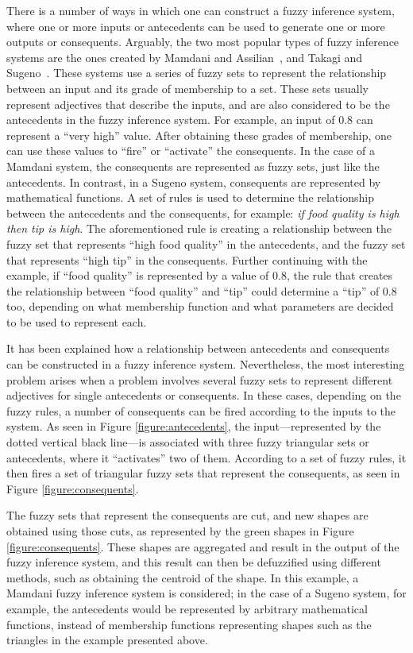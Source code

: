 \documentclass{ieeeaccess}
\begin{document}
There is a number of ways in which one can construct a fuzzy inference system,
where one or more inputs or antecedents can be used to generate one or more
outputs or consequents. Arguably, the two most popular types of fuzzy inference
systems are the ones created by Mamdani and Assilian~\cite{Mamdani1975}, and
Takagi and Sugeno~\cite{Takagi1985}. These systems use a series of fuzzy sets to
represent the relationship between an input and its grade of membership to a
set. These sets usually represent adjectives that describe the inputs, and are
also considered to be the antecedents in the fuzzy inference system. For
example, an input of 0.8 can represent a ``very high'' value. After obtaining
these grades of membership, one can use these values to ``fire'' or ``activate''
the consequents. In the case of a Mamdani system, the consequents are
represented as fuzzy sets, just like the antecedents. In contrast, in a Sugeno
system, consequents are represented by mathematical functions. A set of rules is
used to determine the relationship between the antecedents and the consequents,
for example: \textit{if food quality is high then tip is high}. The
aforementioned rule is creating a relationship between the fuzzy set that
represents ``high food quality'' in the antecedents, and the fuzzy set that
represents ``high tip'' in the consequents. Further continuing with the example,
if ``food quality'' is represented by a value of 0.8, the rule that creates the
relationship between ``food quality'' and ``tip'' could determine a ``tip'' of
0.8 too, depending on what membership function and what parameters are decided
to be used to represent each.

It has been explained how a relationship between antecedents and consequents can
be constructed in a fuzzy inference system. Nevertheless, the most interesting
problem arises when a problem involves several fuzzy sets to represent different
adjectives for single antecedents or consequents. In these cases, depending on
the fuzzy rules, a number of consequents can be fired according to the inputs to
the system. As seen in Figure \ref{figure:antecedents}, the input---represented
by the dotted vertical black line---is associated with three fuzzy
triangular sets or antecedents, where it ``activates'' two of them. According to
a set of fuzzy rules, it then fires a set of triangular fuzzy sets that
represent the consequents, as seen in Figure \ref{figure:consequents}.

The fuzzy sets that represent the consequents are cut, and new shapes are
obtained using those cuts, as represented by the green shapes in Figure
\ref{figure:consequents}. These shapes are aggregated and result in the output
of the fuzzy inference system, and this result can then be defuzzified using
different methods, such as obtaining the centroid of the shape. In this example,
a Mamdani fuzzy inference system is considered; in the case of a Sugeno system,
for example, the antecedents would be represented by arbitrary mathematical
functions, instead of membership functions representing shapes such as the
triangles in the example presented above.
\end{document}
